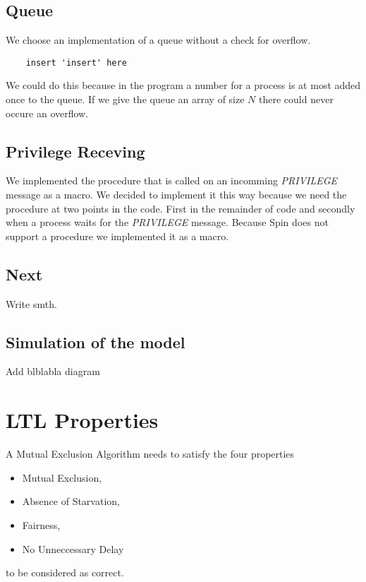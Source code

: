 \documentclass{llncs}
\begin{document}
\subsection{Queue}

We choose an implementation of a queue without a check for overflow.
\begin{lstlisting}
    insert 'insert' here
\end{lstlisting}
We could do this because in the program a number for a process is at most added once to the queue.
If we give the queue an array of size $N$ there could never occure an overflow.

\subsection{Privilege Receving}

We implemented the procedure that is called on an incomming \emph{PRIVILEGE} message as a macro.
We decided to implement it this way because we need the procedure at two points in the code.
First in the remainder of code and secondly when a process waits for the \emph{PRIVILEGE} message.
Because Spin does not support a procedure we implemented it as a macro.

\subsection{Next}

Write smth.

\subsection{Simulation of the model}

Add blblabla diagram

\section{LTL Properties}

A Mutual Exclusion Algorithm needs to satisfy the four properties
\begin{itemize}
    \item Mutual Exclusion,
    \item Absence of Starvation,
    \item Fairness,
    \item No Unneccessary Delay
\end{itemize}
to be considered as correct.
\end{document}
